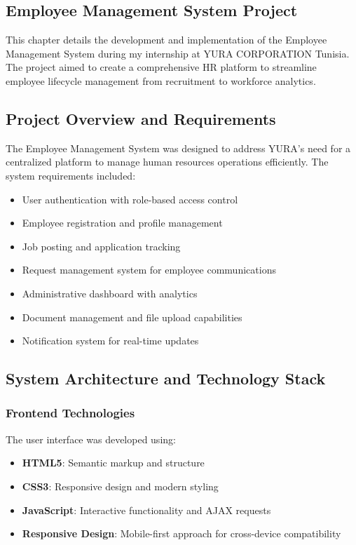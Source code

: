 \begin{center}
    \chapter{Employee Management System Project}
\end{center}
\label{chap:project-implementation}

\noindent This chapter details the development and implementation of the Employee Management System during my internship at YURA CORPORATION Tunisia. The project aimed to create a comprehensive HR platform to streamline employee lifecycle management from recruitment to workforce analytics.

\section{Project Overview and Requirements}

The Employee Management System was designed to address YURA's need for a centralized platform to manage human resources operations efficiently. The system requirements included:

\begin{itemize}
    \item User authentication with role-based access control
    \item Employee registration and profile management
    \item Job posting and application tracking
    \item Request management system for employee communications
    \item Administrative dashboard with analytics
    \item Document management and file upload capabilities
    \item Notification system for real-time updates
\end{itemize}

\section{System Architecture and Technology Stack}

\subsection{Frontend Technologies}
The user interface was developed using:
\begin{itemize}
    \item \textbf{HTML5}: Semantic markup and structure
    \item \textbf{CSS3}: Responsive design and modern styling
    \item \textbf{JavaScript}: Interactive functionality and AJAX requests
    \item \textbf{Responsive Design}: Mobile-first approach for cross-device compatibility
\end{itemize}

